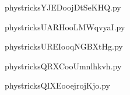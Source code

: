 



    \newcommand{\CaptionFigYJEDoojDtSeKHQ}{<+Type your caption here+>}
    \begin{center}
        
    \end{center}
    phystricksYJEDoojDtSeKHQ.py

    

    \clearpage
    


    \newcommand{\CaptionFigUARHooLMWqvyaI}{<+Type your caption here+>}
    \begin{center}
        
    \end{center}
    phystricksUARHooLMWqvyaI.py

    

    \clearpage
    


    \newcommand{\CaptionFigUREIooqNGBXtHg}{<+Type your caption here+>}
    \begin{center}
        
    \end{center}
    phystricksUREIooqNGBXtHg.py

    

    \clearpage
    


    \newcommand{\CaptionFigQRXCooUmnlhkvh}{<+Type your caption here+>}
    \begin{center}
        
    \end{center}
    phystricksQRXCooUmnlhkvh.py

    

    \clearpage
    


    \newcommand{\CaptionFigQIXEooejrojKjo}{<+Type your caption here+>}
    \begin{center}
        
    \end{center}
    phystricksQIXEooejrojKjo.py

    

    \clearpage
    


